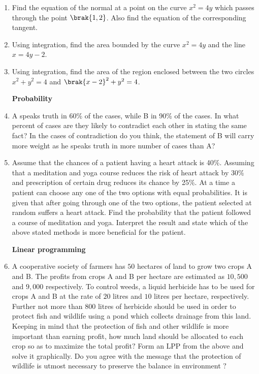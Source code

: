 \documentclass{article}
\begin{document}
\begin{enumerate}
	\item Find the equation of the normal at a point on the curve $x^2=4y$ which passes through the point $\brak{1,2}$. Also find the equation of the corresponding tangent.

	\item Using integration, find the area bounded by the curve $x^2=4y$ and the line $x=4y-2$.

	\item Using integration, find the area of the region enclosed between the two circles $x^{2}+y^{2}=4$ and $\brak{x-2}^{2}+y^{2}=4$.\\

		\centerline{\textbf{Probability}}

	\item A speaks truth in 60\% of the cases, while B in 90\% of the cases. In what percent of cases are they likely to contradict each other in stating the same fact? In the cases of contradiction do you think, the statement of B will carry more weight as he speaks truth in more number of cases than A?

	\item Assume that the chances of a patient having a heart attack is 40$\%$. Assuming that a meditation and yoga course reduces the risk of heart attack by 30$\%$ and prescription of certain drug reduces its chance by 25$\%$. At a time a patient can choose any one of the two options with equal probabilities. It is given that after going through one of the two options, the patient selected at random suffers a heart attack. Find the probability that the patient followed a course of meditation and yoga. Interpret the result and state which of the above stated methods is more beneficial for the patient.\\

		\centerline{\textbf{Linear programming}}

	\item A cooperative society of farmers has $50$ hectares of land to grow two crops A and B. The profits from crops A and B per hectare are estimated as $10,500$ and $9,000$ respectively. To control weeds, a liquid herbicide has to be used for crops A and B at the rate of $20$ litres and $10$ litres per hectare, respectively. Further not more than $800$ litres of herbicide should be used in order to protect fish and wildlife using a pond which collects drainage from this land. Keeping in mind that the protection of fish and other wildlife is more important than earning profit, how much land should be allocated to each crop so as to maximize the total profit$?$ Form an LPP from the above and solve it graphically. Do you agree with the message that the protection of wildlife is utmost necessary to preserve the balance in environment $?$

\end{enumerate}
\end{document}
